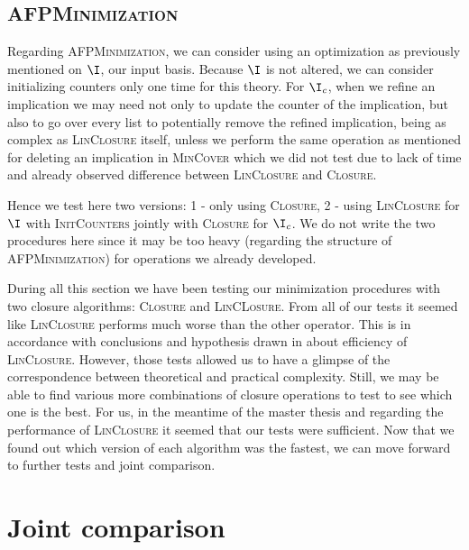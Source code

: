 \subsection{\textsc{AFPMinimization}}

Regarding \textsc{AFPMinimization}, we can consider using an optimization as
previously mentioned on $\I$, our input basis. Because $\I$ is not altered, we can consider initializing counters only one time for this theory. For $\I_c$, when we refine an implication we may need not only to update the counter of 
the implication, but also to go over every list to potentially remove the
refined implication, being as complex as \textsc{LinClosure} itself, unless we 
perform the same operation as mentioned for deleting an implication in \textsc{MinCover} which we did not test due to lack of time and already observed difference between \textsc{LinClosure} and \textsc{Closure}. 

\vspace{1.2em}

Hence we test here two versions: 1 - only using \textsc{Closure}, 2 - using
\textsc{LinClosure} for $\I$ with \textsc{InitCounters} jointly with 
\textsc{Closure} for $\I_c$. We do not write the two procedures here since
it may be too heavy (regarding the structure of \textsc{AFPMinimization}) for operations we already developed.


\vspace{1.2em}

During all this section we have been testing our minimization procedures with two closure algorithms: \textsc{Closure} and \textsc{LinCLosure}. From all of
our tests it seemed like \textsc{LinClosure} performs much worse than the 
other operator. This is in accordance with conclusions and hypothesis drawn in
\cite{bazhanov_optimizations_2014} about efficiency of \textsc{LinClosure}. However, those tests allowed us to have a glimpse of the correspondence between
theoretical and practical complexity. Still, we may be able to find various more combinations of closure operations to test to see which one is the best. For us, in the meantime of the master thesis and regarding the performance of \textsc{LinClosure} it seemed that our tests were sufficient. Now that we found out which version of each algorithm was the fastest, we can move forward to 
further tests and joint comparison.


\section{Joint comparison}

